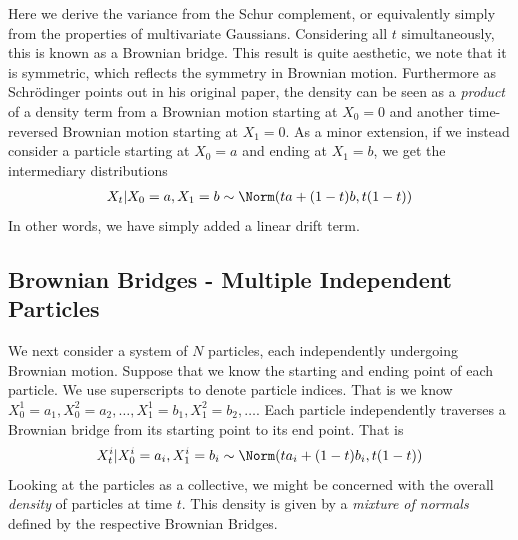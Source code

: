 \documentclass{article}
\begin{document}
Here we derive the variance from the Schur complement, or equivalently simply
from the properties of multivariate Gaussians. Considering all $t$
simultaneously, this is known as a Brownian bridge. This result is quite
aesthetic, we note that it is symmetric, which reflects the symmetry in Brownian
motion.  Furthermore as Schrödinger points out in his original paper, the
density can be seen as a \emph{product} of a density term from a Brownian motion
starting at $X_0=0$ and another time-reversed Brownian motion starting at
$X_1=0$. As a minor extension, if we instead consider a particle starting at
$X_0=a$ and ending at $X_1=b$, we get the intermediary distributions
\begin{align}
    X_t | X_0 = a, X_1 = b \sim \Norm(ta + (1-t)b, t(1-t))
\end{align}
In other words, we have simply added a linear drift term. 

\subsection{Brownian Bridges - Multiple Independent Particles}
We next consider a system of $N$ particles, each independently undergoing
Brownian motion. Suppose that we know the starting and ending point of each
particle. We use superscripts to denote particle indices. That is we know
$X^1_0 = a_1, X^2_0 = a_2, \ldots, X^1_1 = b_1, X^2_1 = b_2, \ldots$. Each
particle independently traverses a Brownian bridge from its starting point to
its end point. That is
\begin{align}
    X^i_t | X^i_0 = a_i, X^i_1 = b_i \sim \Norm(ta_i + (1-t)b_i, t(1-t))
\end{align}
Looking at the particles as a collective, we might be
concerned with the overall \emph{density} of particles at time $t$. This 
density is given by a \emph{mixture of normals} defined by the respective
Brownian Bridges.
\end{document}
